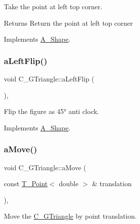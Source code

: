 Take the point at left top corner. 

\begin{DoxyReturn}{Returns}
Return the point at left top corner 
\end{DoxyReturn}


Implements \hyperlink{classA__Shape_abe6781b13037bf7ecea8ff9456b31533}{A\+\_\+\+Shape}.

\mbox{\label{classC__GTriangle_a9ffdddb586b42757ffca6a9ca0c20934}} 
\subsubsection{\texorpdfstring{a\+Left\+Flip()}{aLeftFlip()}}
{\footnotesize\ttfamily void C\+\_\+\+G\+Triangle\+::a\+Left\+Flip (\begin{DoxyParamCaption}{ }\end{DoxyParamCaption})\hspace{0.3cm}{\ttfamily [override]}, {\ttfamily [virtual]}}



Flip the figure as 45° anti clock. 



Implements \hyperlink{classA__Shape_abe947e7003cb63be2b4f6c439533427d}{A\+\_\+\+Shape}.

\mbox{\label{classC__GTriangle_a07789441ce75f81fd4c4649a0115edbe}} 
\subsubsection{\texorpdfstring{a\+Move()}{aMove()}}
{\footnotesize\ttfamily void C\+\_\+\+G\+Triangle\+::a\+Move (\begin{DoxyParamCaption}\item[{const \hyperlink{classT__Point}{T\+\_\+\+Point}$<$ double $>$ \&}]{translation }\end{DoxyParamCaption})\hspace{0.3cm}{\ttfamily [override]}, {\ttfamily [virtual]}}



Move the \hyperlink{classC__GTriangle}{C\+\_\+\+G\+Triangle} by point translation. 


